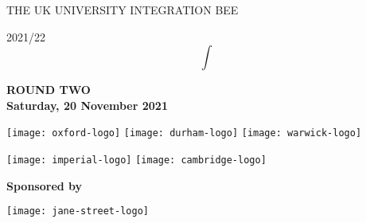 \documentclass[11pt, a4paper]{article}
\begin{document}
    

\thispagestyle{empty}

\begin{center}
    \Huge\textsc{THE UK UNIVERSITY INTEGRATION BEE}

    \Huge 2021/22
    $$
    \int
    $$
\end{center}

\vspace{0.8in}

\begin{center}
    \Huge\sffamily\textbf{ROUND TWO}\\
    \LARGE\textbf{Saturday, 20 November 2021}
\end{center}

\vspace{0.7in}

\begin{center}
    \begin{adjustwidth}{2cm}{2cm}

\texttt{[image: oxford-logo]}
\hfill
\texttt{[image: durham-logo]}
\hfill
\texttt{[image: warwick-logo]}


\vspace{0.2in}

\texttt{[image: imperial-logo]}
\hfill
\texttt{[image: cambridge-logo]}

\end{adjustwidth}
\end{center}


\vspace{0.6in}

\begin{center}
    \Large
\textbf{Sponsored by}

\vspace{0.15in}

\texttt{[image: jane-street-logo]}
\end{center}
\clearpage






\end{document}
